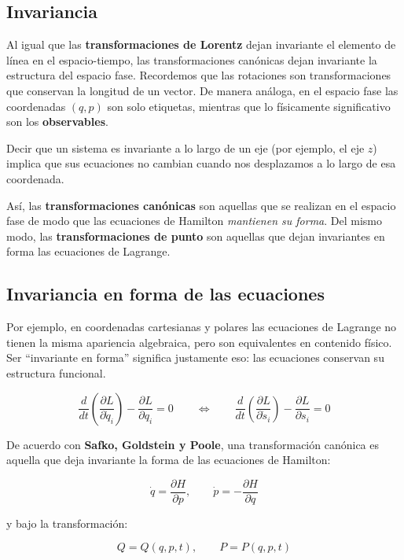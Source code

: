 \documentclass{article}
\begin{document}
\subsection{Invariancia}

Al igual que las \textbf{transformaciones de Lorentz} dejan invariante el elemento de línea en el espacio-tiempo, las transformaciones canónicas dejan invariante la estructura del espacio fase.  
Recordemos que las rotaciones son transformaciones que conservan la longitud de un vector. De manera análoga, en el espacio fase las coordenadas \((q,p)\) son solo etiquetas, mientras que lo físicamente significativo son los \textbf{observables}. 

Decir que un sistema es invariante a lo largo de un eje (por ejemplo, el eje $z$) implica que sus ecuaciones no cambian cuando nos desplazamos a lo largo de esa coordenada.

Así, las \textbf{transformaciones canónicas} son aquellas que se realizan en el espacio fase de modo que las ecuaciones de Hamilton \emph{mantienen su forma}.  
Del mismo modo, las \textbf{transformaciones de punto} son aquellas que dejan invariantes en forma las ecuaciones de Lagrange.


\subsection{Invariancia en forma de las ecuaciones}

Por ejemplo, en coordenadas cartesianas y polares las ecuaciones de Lagrange no tienen la misma apariencia algebraica, pero son equivalentes en contenido físico.  
Ser “invariante en forma” significa justamente eso: las ecuaciones conservan su estructura funcional. 

\[
\frac{d}{dt} \!\left( \frac{\partial L}{\partial \dot{q}_{i}} \right)
- \frac{\partial L}{\partial q_{i}} = 0
\qquad \Longleftrightarrow \qquad
\frac{d}{dt} \!\left( \frac{\partial L}{\partial \dot{s}_{i}} \right)
- \frac{\partial L}{\partial s_{i}} = 0
\]

De acuerdo con \textbf{Safko, Goldstein y Poole}, una transformación canónica es aquella que deja invariante la forma de las ecuaciones de Hamilton:

\[
\dot{q} = \frac{\partial H}{\partial p},
\qquad
\dot{p} = -\frac{\partial H}{\partial q}
\]

y bajo la transformación:

\[
\boxed{
Q = Q(q,p,t), \qquad P = P(q,p,t)
}
\]
\end{document}
